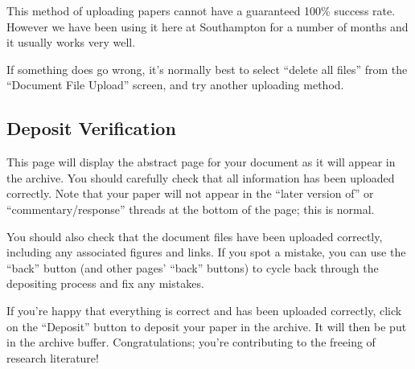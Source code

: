 This method of uploading papers cannot have a guaranteed 100\% success rate. However we have been using it here at Southampton for a number of months and it usually works very well.

If something does go wrong, it's normally best to select ``delete all files'' from the ``Document File Upload'' screen, and try another uploading method.


\subsection{Deposit Verification}

This page will display the abstract page for your document as it will appear in the archive. You should carefully check that all information has been uploaded correctly. Note that your paper will not appear in the ``later version of'' or ``commentary/response'' threads at the bottom of the page; this is normal.

You should also check that the document files have been uploaded correctly, including any associated figures and links. If you spot a mistake, you can use the ``back'' button (and other pages' ``back'' buttons) to cycle back through the depositing process and fix any mistakes.

If you're happy that everything is correct and has been uploaded correctly, click on the ``Deposit'' button to deposit your paper in the archive. It will then be put in the archive buffer. Congratulations; you're contributing to the freeing of research literature!
